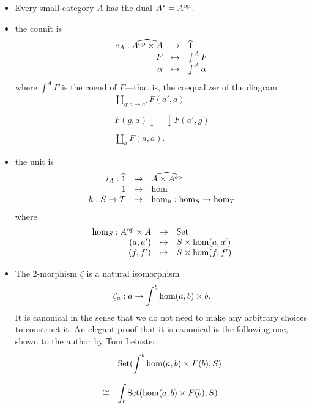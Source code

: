 \documentclass[12pt,twoside,openright]{report}
\newcommand{\Set}{\mathrm{Set}}
\renewcommand{\hom}{{\rm hom}}
\newcommand{\op}{{\rm op}}
\begin{document}
\begin{itemize}
  \item Every small category $A$ has the dual $A^* = A^\op$.
  \item the counit is
    \[
    \begin{array}{rcl}
      e_A:\widehat{A^\op \times A} & \to     & \widehat{1} \\
      F                            & \mapsto & \int^A F \\
      \alpha                       & \mapsto & \int^A \alpha
    \end{array}
    \]
    where $\int^A F$ is the coend of $F$---that is, the coequalizer of the diagram
    \[ \begin{array}{c}\displaystyle \coprod_{g:a \to a'} F(a', a) \\ \\
\displaystyle F(g, a) \downarrow \quad \downarrow F(a',g) \\ \\
\displaystyle \coprod_a F(a,a). \end{array}\]
  \item the unit is 
    \[
    \begin{array}{rcl}
      i_A:\widehat{1} & \to     & \widehat{A \times A^\op} \\
      1               & \mapsto & \hom \\
      h:S\to T        & \mapsto & \hom_h:\hom_S \to \hom_T
    \end{array}
    \]
    where
    \[
    \begin{array}{rcl}
      \hom_S:A^\op \times A & \to     & \Set \\ 
      (a,a')                & \mapsto & S \times \hom(a,a') \\
      (f,f')                & \mapsto & S \times \hom(f,f')
    \end{array}
    \]
  \item The 2-morphism $\zeta$ is a natural isomorphism
  \[ \zeta_a: a \to \int^b \hom(a,b) \times b. \]
It is canonical in the sense that we do not need to make any arbitrary choices to construct it.  An elegant proof that it is canonical is the following one, shown to the author by Tom Leinster.
  \[ \begin{array}{rl}
           & \displaystyle \Set(\int^b \hom(a,b) \times F(b), S) \\ \\
     \cong & \displaystyle \int_b \Set(\hom(a,b)\times F(b), S) \\ \\

\end{array}\]
\end{itemize}
\end{document}
